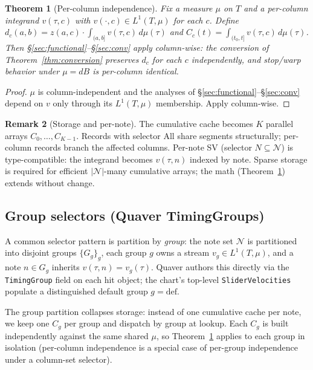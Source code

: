 \documentclass[11pt]{article}
\newtheorem{theorem}{Theorem}
\theoremstyle{definition}
\newtheorem{remark}[theorem]{Remark}
\newcommand{\dmu}{\,d\mu}
\newcommand{\Lone}{L^{1}}
\begin{document}
\begin{theorem}[Per-column independence]
\label{thm:per-column}
Fix a measure $\mu$ on $T$ and a per-column integrand $v(\tau, c)$ with
$v(\cdot, c) \in \Lone(T, \mu)$ for each $c$. Define
$d_c(a, b) = z(a, c) \cdot \int_{(a,b]} v(\tau, c)\dmu(\tau)$ and
$C_c(t) = \int_{(t_0, t]} v(\tau, c)\dmu(\tau)$. Then
\S\ref{sec:functional}--\S\ref{sec:conv} apply column-wise: the conversion of
Theorem~\ref{thm:conversion} preserves $d_c$ for each $c$ independently,
and stop/warp behavior under $\mu = dB$ is per-column identical.
\end{theorem}

\begin{proof}
$\mu$ is column-independent and the analyses of
\S\ref{sec:functional}--\S\ref{sec:conv} depend on $v$ only through its
$\Lone(T, \mu)$ membership. Apply column-wise. \qedhere
\end{proof}

\begin{remark}[Storage and per-note]
The cumulative cache becomes $K$ parallel arrays $C_0, \dots, C_{K-1}$.
Records with selector $\mathrm{All}$ share segments structurally; per-column
records branch the affected columns. Per-note SV (selector
$N \subseteq \mathcal{N}$) is type-compatible: the integrand becomes
$v(\tau, n)$ indexed by note. Sparse storage is required for efficient
$|\mathcal{N}|$-many cumulative arrays; the math (Theorem~\ref{thm:per-column})
extends without change.
\end{remark}

\subsection{Group selectors (Quaver TimingGroups)}
\label{sec:groups}

A common selector pattern is partition by \emph{group}: the note set
$\mathcal{N}$ is partitioned into disjoint groups $\{G_g\}_g$, each
group $g$ owns a stream $v_g \in \Lone(T, \mu)$, and a note $n \in G_g$
inherits $v(\tau, n) = v_g(\tau)$. Quaver authors this directly via the
\texttt{TimingGroup} field on each hit object; the chart's top-level
\texttt{SliderVelocities} populate a distinguished default group
$g = \mathrm{def}$.

The group partition collapses storage: instead of one cumulative cache
per note, we keep one $C_g$ per group and dispatch by group at lookup.
Each $C_g$ is built independently against the same shared $\mu$, so
Theorem~\ref{thm:per-column} applies to each group in isolation
(per-column independence is a special case of per-group independence
under a column-set selector).
\end{document}
